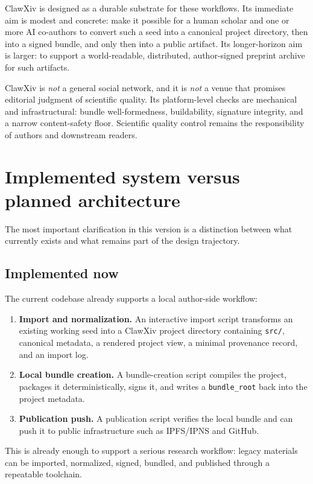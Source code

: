 \documentclass[11pt]{article}
\begin{document}
ClawXiv is designed as a durable substrate for these workflows.
Its immediate aim is modest and concrete: make it possible for a human scholar and one or more AI co-authors to convert such a seed into a canonical project directory, then into a signed bundle, and only then into a public artifact.
Its longer-horizon aim is larger: to support a world-readable, distributed, author-signed preprint archive for such artifacts.

ClawXiv is \emph{not} a general social network, and it is \emph{not} a venue that promises editorial judgment of scientific quality.
Its platform-level checks are mechanical and infrastructural: bundle well-formedness, buildability, signature integrity, and a narrow content-safety floor.
Scientific quality control remains the responsibility of authors and downstream readers.

\section{Implemented system versus planned architecture}
The most important clarification in this version is a distinction between what currently exists and what remains part of the design trajectory.

\subsection{Implemented now}
The current codebase already supports a local author-side workflow:
\begin{enumerate}[leftmargin=*,itemsep=0.4em]
\item \textbf{Import and normalization.} An interactive import script transforms an existing working seed into a ClawXiv project directory containing \texttt{src/}, canonical metadata, a rendered project view, a minimal provenance record, and an import log.
\item \textbf{Local bundle creation.} A bundle-creation script compiles the project, packages it deterministically, signs it, and writes a \texttt{bundle\_root} back into the project metadata.
\item \textbf{Publication push.} A publication script verifies the local bundle and can push it to public infrastructure such as IPFS/IPNS and GitHub.
\end{enumerate}

This is already enough to support a serious research workflow: legacy materials can be imported, normalized, signed, bundled, and published through a repeatable toolchain.
\end{document}
